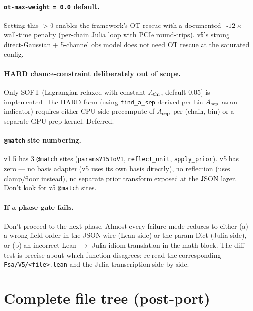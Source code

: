 \documentclass[11pt,a4paper]{article}
\begin{document}
\paragraph{\texttt{ot-max-weight = 0.0} default.} Setting this $> 0$
enables the framework's OT rescue with a documented $\sim 12\times$
wall-time penalty (per-chain Julia loop with PCIe round-trips).
v5's strong direct-Gaussian + 5-channel obs model does not need
OT rescue at the saturated config.

\paragraph{HARD chance-constraint deliberately out of scope.} Only
SOFT (Lagrangian-relaxed with constant $A_{\rm thr}$, default
0.05) is implemented. The HARD form (using
\texttt{find\_a\_sep}-derived per-bin $A_{\rm sep}$ as an
indicator) requires either CPU-side precompute of $A_{\rm sep}$
per (chain, bin) or a separate GPU prep kernel. Deferred.

\paragraph{\texttt{@match} site numbering.} v1.5 has 3 \texttt{@match}
sites (\texttt{paramsV15ToV1}, \texttt{reflect\_unit},
\texttt{apply\_prior}). v5 has zero --- no basis adapter (v5 uses
its own basis directly), no reflection (uses clamp/floor instead),
no separate prior transform exposed at the JSON layer. Don't look
for v5 \texttt{@match} sites.

\paragraph{If a phase gate fails.} Don't proceed to the next phase.
Almost every failure mode reduces to either (a) a wrong field
order in the JSON wire (Lean side) or the param Dict (Julia side),
or (b) an incorrect Lean $\to$ Julia idiom translation in the math
block. The diff test is precise about which function disagrees;
re-read the corresponding \texttt{Fsa/V5/<file>.lean} and the
Julia transcription side by side.


\appendix
\section{Complete file tree (post-port)}
\label{app:files}
\end{document}
